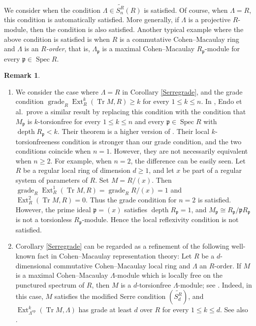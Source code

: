 \documentclass{amsart}
\theoremstyle{definition}
\newtheorem{rmk}[thm]{Remark}
\theoremstyle{remark}
\numberwithin{equation}{thm}
\def\depth{\operatorname{depth}}
\def\Ext{\operatorname{Ext}}
\def\ge{\geqslant}
\def\grade{\operatorname{grade}}
\def\le{\leqslant}
\def\p{\mathfrak{p}}
\def\spec{\operatorname{Spec}}
\def\tr{\operatorname{Tr}}
\begin{document}
We consider when the condition $\Lambda\in\widetilde{S_n^R}(R)$ is satisfied. Of course, when $\Lambda=R$, this condition is automatically satisfied.
More generally, if $\Lambda$ is a projective $R$-module, then the condition is also satisfied.
Another typical example where the above condition is satisfied is when $R$ is a commutative Cohen--Macaulay ring
and $\Lambda$ is an \textit{$R$-order}, that is, $\Lambda_\p$ is a maximal Cohen--Macaulay $R_\p$-module for every $\p\in\spec R$.

\begin{rmk}
\begin{enumerate}[\rm(1)]
   \item We consider the case where $\Lambda=R$ in Corollary \ref{Serregrade}, and the grade condition $\grade_R\Ext^k_R(\tr M,R)\ge k$ for every $1\le k\le n$.
   In \cite[Theorem 6.13(1)(2)]{EGGHIKMT}, Endo et al.\ prove a similar result by replacing this condition with the condition that $M_\p$ is $k$-torsionfree for every $1\le k\le n$ and every $\p\in\spec R$ with $\depth R_\p<k$.
   Their theorem is a higher version of \cite[Proposition 1.4.1]{BH}.
   Their local $k$-torsionfreeness condition is stronger than our grade condition, and the two conditions coincide when $n=1$.
   However, they are not necessarily equivalent when $n\ge2$.
   For example, when $n=2$, the difference can be easily seen.
   Let $R$ be a regular local ring of dimension $d\ge1$, and let $x$ be part of a regular system of parameters of $R$.
   Set $M=R/(x)$. Then $\grade_R\Ext^1_R(\tr M,R)=\grade_R R/(x)=1$ and $\Ext^2_R(\tr M,R)=0$.
   Thus the grade condition for $n=2$ is satisfied. However, the prime ideal $\p=(x)$ satisfies $\depth R_\p=1$, and $M_\p\cong R_\p/\p R_\p$ is not a torsionless $R_\p$-module.
   Hence the local reflexivity condition is not satisfied.
   \item Corollary \ref{Serregrade} can be regarded as a refinement of the following well-known fact in Cohen--Macaulay representation theory:
   Let $R$ be a $d$-dimensional commutative Cohen--Macaulay local ring and $\Lambda$ an $R$-order.
   If $M$ is a maximal Cohen--Macaulay $\Lambda$-module which is locally free on the punctured spectrum of $R$, then $M$ is a $d$-torsionfree $\Lambda$-module; see \cite{Aus78,EG,LW,Yos90}.
   Indeed, in this case, $M$ satisfies the modified Serre condition $(\widetilde{S_d^R})$, and $\Ext^k_{\Lambda^{\mathrm{op}}}(\tr M,\Lambda)$ has grade at least $d$ over $R$ for every $1\le k\le d$. See also \cite[Proposition 4.3]{DKLO}.
\end{enumerate}
\end{rmk}
\end{document}
